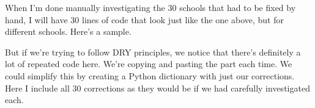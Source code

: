 \documentclass[letterpaper,10pt,english]{jupyterBook}
\begin{document}
\sphinxAtStartPar
When I’m done manually investigating the 30 schools that had to be fixed by hand, I will have 30 lines of code that look just like the one above, but for different schools.  Here’s a sample.

\begin{sphinxVerbatim}[commandchars=\\\{\}]
\PYG{p}{[}\PYG{p}{]}  
\PYG{p}{[}\PYG{p}{]}  
\PYG{p}{[}\PYG{p}{]}  
\PYG{p}{[}\PYG{p}{]}  
\end{sphinxVerbatim}

\sphinxAtStartPar
But if we’re trying to follow DRY principles, we notice that there’s definitely a lot of repeated code here.  We’re copying and pasting the  part each time.  We could simplify this by creating a Python dictionary with just our corrections.  Here I include all 30 corrections as they would be if we had carefully investigated each.
\end{document}
